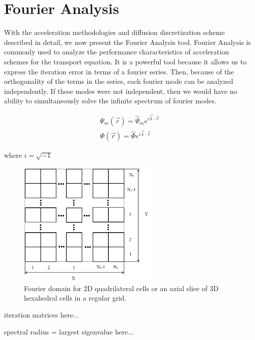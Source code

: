\section{Fourier Analysis}
\label{sec::DSA_Fourier}

With the acceleration methodologies and diffusion discretization scheme described in detail, we now present the Fourier Analysis tool. Fourier Analysis is commonly used to analyze the performance characteristics of acceleration schemes for the transport equation. It is a powerful tool because it allows us to express the iteration error in terms of a fourier series. Then, because of the orthogonality of the terms in the series, each fourier mode can be analyzed independently. If these modes were not independent, then we would have no ability to simultaneously solve the infinite spectrum of fourier modes.


\begin{equation}
\label{eq::fourier_sol}
\begin{aligned}
\Psi_m (\vec{r}) = \hat{\Psi}_m e^{i \vec{\lambda} \cdot \vec{r}}\\
\Phi (\vec{r}) = \hat{\Phi} e^{i \vec{\lambda} \cdot \vec{r}}
\end{aligned}
\end{equation}

\noindent where $i=\sqrt{-1}$

\begin{figure}
\centering
\includegraphics[width=0.60\textwidth]{figures/sec_DSA/fourier_sq_layout.png}
\caption[Fourier domain]{Fourier domain for 2D quadrilateral cells or an axial slice of 3D hexahedral cells in a regular grid.}
\label{fig::DSA_fourier_grid_layout}
\end{figure}

iteration matrices here...

spectral radius = largest eigenvalue here...

